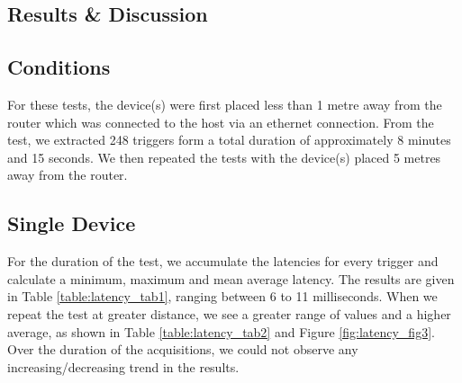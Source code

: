 \subsection*{Results \& Discussion}

\subsection*{Conditions}
For these tests, the device(s) were first placed less than 1 metre away from the router which was connected to the host via an ethernet connection. From the test, we extracted 248 triggers form a total duration of approximately 8 minutes and 15 seconds. We then repeated the tests with the device(s) placed 5 metres away from the router.

\subsection*{Single Device}
For the duration of the test, we accumulate the latencies for every trigger and calculate a minimum, maximum and mean average latency. The results are given in Table \ref{table:latency_tab1}, ranging between 6 to 11 milliseconds. When we repeat the test at greater distance, we see a greater range of values and a higher average, as shown in Table \ref{table:latency_tab2} and Figure \ref{fig:latency_fig3}. Over the duration of the acquisitions, we could not observe any increasing/decreasing trend in the results.


